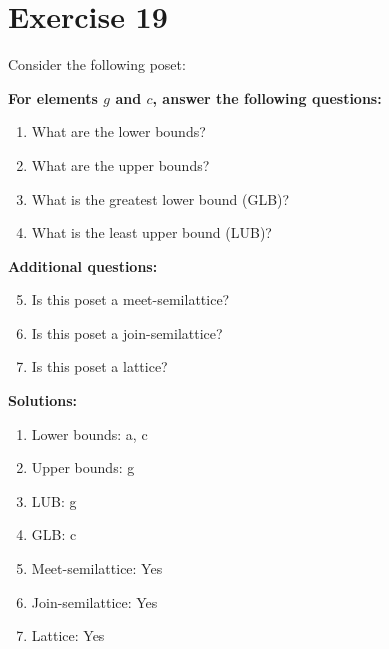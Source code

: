 \documentclass{article}
\begin{document}
\section*{Exercise 19}
Consider the following poset:
\begin{center}
\end{center}

    \textbf{For elements $g$ and $c$, answer the following questions:}
\begin{enumerate}
    \item What are the lower bounds?
    \item What are the upper bounds?
    \item What is the greatest lower bound (GLB)?
    \item What is the least upper bound (LUB)?
\end{enumerate}
    \hspace*{3ex} \textbf{Additional questions:}
\begin{enumerate}
    \setcounter{enumi}{4}
    \item Is this poset a meet-semilattice?
    \item Is this poset a join-semilattice?
    \item Is this poset a lattice?
\end{enumerate}

\textbf{Solutions:}
\begin{enumerate}
    \item Lower bounds: {a, c}
    \item Upper bounds: {g}
    \item LUB: g
    \item GLB: c
    \item Meet-semilattice: Yes
    \item Join-semilattice: Yes
    \item Lattice: Yes
\end{enumerate}
\newpage
\end{document}

